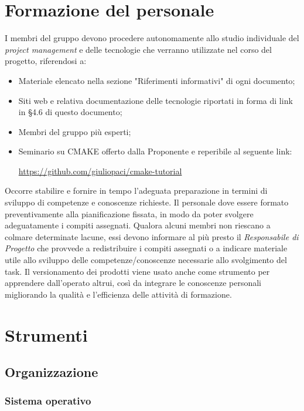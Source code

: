 \documentclass[../NormediProgetto.tex]{subfiles}
\begin{document}
	\section{Formazione del personale}
	I membri del gruppo devono procedere autonomamente allo studio individuale del \textit{project management} e delle tecnologie che verranno utilizzate nel corso del progetto, riferendosi a:
	\begin{itemize}
		\item Materiale elencato nella sezione "Riferimenti informativi" di ogni documento;
		\item Siti web e relativa documentazione delle tecnologie riportati in forma di link in §4.6 di questo documento;
		\item Membri del gruppo più esperti;
		\item Seminario su CMAKE offerto dalla Proponente e reperibile al seguente link:
		\begin{center}
			\url{https://github.com/giuliopaci/cmake-tutorial}
		\end{center} 
	\end{itemize}
	Occorre stabilire e fornire in tempo l'adeguata preparazione in termini di sviluppo di competenze e conoscenze richieste. Il personale dove essere formato preventivamente alla pianificazione fissata, in modo da poter svolgere adeguatamente i compiti
	assegnati. Qualora alcuni membri non riescano a colmare determinate lacune, essi devono informare al più presto il \textit{Responsabile di Progetto} che provvede a redistribuire i compiti assegnati o a indicare materiale utile allo sviluppo delle competenze/conoscenze necessarie allo svolgimento del task.
	Il versionamento dei prodotti viene usato anche come strumento per apprendere dall'operato altrui, così da integrare le conoscenze personali migliorando la qualità e l'efficienza delle attività di formazione.
	
	\section{Strumenti}
	
	\subsection{Organizzazione}
	
	\subsubsection{Sistema operativo}
	
\end{document}
